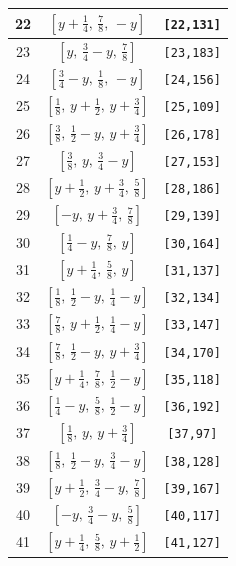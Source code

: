 \documentclass[fleqn,8pt]{jsarticle}
\begin{document}
\begin{longtable}{ccc}
22 & $\left[ y + \frac{1}{4},\, \frac{7}{8},\, - y \right]$ & {\tt [22,131]} \\ \hline
23 & $\left[ y,\, \frac{3}{4} - y,\, \frac{7}{8} \right]$ & {\tt [23,183]} \\ \hline
24 & $\left[ \frac{3}{4} - y,\, \frac{1}{8},\, - y \right]$ & {\tt [24,156]} \\ \hline
25 & $\left[ \frac{1}{8},\, y + \frac{1}{2},\, y + \frac{3}{4} \right]$ & {\tt [25,109]} \\ \hline
26 & $\left[ \frac{3}{8},\, \frac{1}{2} - y,\, y + \frac{3}{4} \right]$ & {\tt [26,178]} \\ \hline
27 & $\left[ \frac{3}{8},\, y,\, \frac{3}{4} - y \right]$ & {\tt [27,153]} \\ \hline
28 & $\left[ y + \frac{1}{2},\, y + \frac{3}{4},\, \frac{5}{8} \right]$ & {\tt [28,186]} \\ \hline
29 & $\left[ - y,\, y + \frac{3}{4},\, \frac{7}{8} \right]$ & {\tt [29,139]} \\ \hline
30 & $\left[ \frac{1}{4} - y,\, \frac{7}{8},\, y \right]$ & {\tt [30,164]} \\ \hline
31 & $\left[ y + \frac{1}{4},\, \frac{5}{8},\, y \right]$ & {\tt [31,137]} \\ \hline
32 & $\left[ \frac{1}{8},\, \frac{1}{2} - y,\, \frac{1}{4} - y \right]$ & {\tt [32,134]} \\ \hline
33 & $\left[ \frac{7}{8},\, y + \frac{1}{2},\, \frac{1}{4} - y \right]$ & {\tt [33,147]} \\ \hline
34 & $\left[ \frac{7}{8},\, \frac{1}{2} - y,\, y + \frac{3}{4} \right]$ & {\tt [34,170]} \\ \hline
35 & $\left[ y + \frac{1}{4},\, \frac{7}{8},\, \frac{1}{2} - y \right]$ & {\tt [35,118]} \\ \hline
36 & $\left[ \frac{1}{4} - y,\, \frac{5}{8},\, \frac{1}{2} - y \right]$ & {\tt [36,192]} \\ \hline
37 & $\left[ \frac{1}{8},\, y,\, y + \frac{3}{4} \right]$ & {\tt [37,97]} \\ \hline
38 & $\left[ \frac{1}{8},\, \frac{1}{2} - y,\, \frac{3}{4} - y \right]$ & {\tt [38,128]} \\ \hline
39 & $\left[ y + \frac{1}{2},\, \frac{3}{4} - y,\, \frac{7}{8} \right]$ & {\tt [39,167]} \\ \hline
40 & $\left[ - y,\, \frac{3}{4} - y,\, \frac{5}{8} \right]$ & {\tt [40,117]} \\ \hline
41 & $\left[ y + \frac{1}{4},\, \frac{5}{8},\, y + \frac{1}{2} \right]$ & {\tt [41,127]} \\ \hline

\end{longtable}
\end{document}
